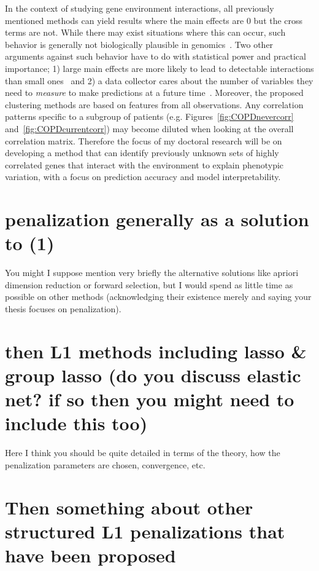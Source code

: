 \documentclass[12pt,letterpaper]{article}
\begin{document}
In the context of studying gene environment interactions, all previously mentioned methods can yield results where the main effects are 0 but the cross terms are not. While there may exist situations where this can occur, such behavior is generally not biologically plausible in genomics~\citep{bakermans2015hidden}. 
Two other arguments against such behavior have to do with statistical power and practical importance; 1) large main effects are more likely to lead to detectable interactions than small ones~\citep{cox1984interaction} and 2) a data collector cares about the number of variables they need to \textit{measure} to make predictions at a future time~\citep{bien2013lasso}. 
Moreover, the proposed clustering methods are based on features from all observations. Any correlation patterns specific to a subgroup of patients (e.g. Figures~\ref{fig:COPDnevercorr} and~\ref{fig:COPDcurrentcorr}) may become diluted when looking at the overall correlation matrix. 
Therefore the focus of my doctoral research will be on developing a method that can identify previously unknown sets of highly correlated genes that interact with the environment to explain phenotypic variation, with a focus on prediction accuracy and model interpretability. 




\section{penalization generally as a solution to (1)}
You might I suppose mention very briefly the alternative solutions like apriori dimension reduction or forward selection, but I would spend as little time as possible on other methods (acknowledging their existence merely and saying your thesis focuses on penalization).



\section{then L1 methods including lasso \& group lasso (do you discuss elastic net? if so then you might need to include this too)}
Here I think you should be quite detailed in terms of the theory, how the penalization parameters are chosen, convergence, etc.


\section{Then something about other structured L1 penalizations that have been proposed}
\end{document}
